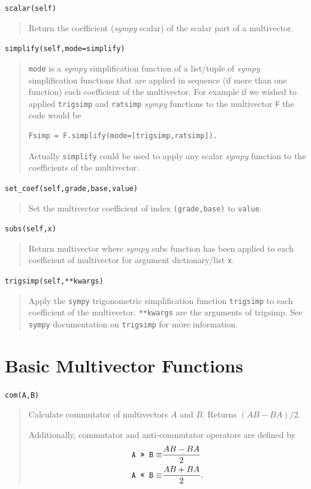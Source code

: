 \documentclass[12pt]{report}
\newcommand{\bfrac}[2]{\displaystyle\frac{#1}{#2}}
\newcommand{\T}[1]{\texttt{#1}}
\begin{document}
\T{scalar(self)}
\begin{quote}
    Return the coefficient (\emph{sympy} scalar) of the scalar part of a
    multivector.
\end{quote}

\T{simplify(self,mode=simplify)}
\begin{quote}
   \T{mode} is a \emph{sympy} simplification function of a list/tuple of \emph{sympy}
   simplification functions that are applied in sequence (if more than
   one function) each coefficient of the multivector.  For example if
   we wished to applied \T{trigsimp} and \T{ratsimp} \emph{sympy} functions to the
   multivector \T{F} the code would be
   \begin{lstlisting}[numbers=none]
   Fsimp = F.simplify(mode=[trigsimp,ratsimp]).
   \end{lstlisting}
   \vspace{-10pt}
   Actually \T{simplify} could be used to apply any scalar \emph{sympy} function to
   the coefficients of the multivector.
\end{quote}

\T{set\_coef(self,grade,base,value)}
\begin{quote}
   Set the multivector coefficient of index \T{(grade,base)} to \T{value}.
\end{quote}

\T{subs(self,x)}
\begin{quote}
   Return multivector where \emph{sympy} subs function has been applied to each
   coefficient of multivector for argument dictionary/list \T{x}.
\end{quote}

\T{trigsimp(self,**kwargs)}
\begin{quote}
   Apply the \T{sympy} trigonometric simplification function \T{trigsimp} to
   each coefficient of the multivector. \T{**kwargs} are the arguments of
   trigsimp.  See \T{sympy} documentation on \T{trigsimp} for more information.
\end{quote}

\section{Basic Multivector Functions}

\T{com(A,B)}
\begin{quote}
   Calculate commutator of multivectors $A$ and $B$.  Returns $(AB-BA)/2$.
        
    Additionally, commutator and anti-commutator operators are
    defined by
    \begin{align*}
    		\mbox{\tt{A >> B}} \equiv & \bfrac{AB - BA}{2} \\
    		\mbox{\tt{A << B}} \equiv & \bfrac{AB + BA}{2}.
    \end{align*}
    
\end{quote}
\end{document}
